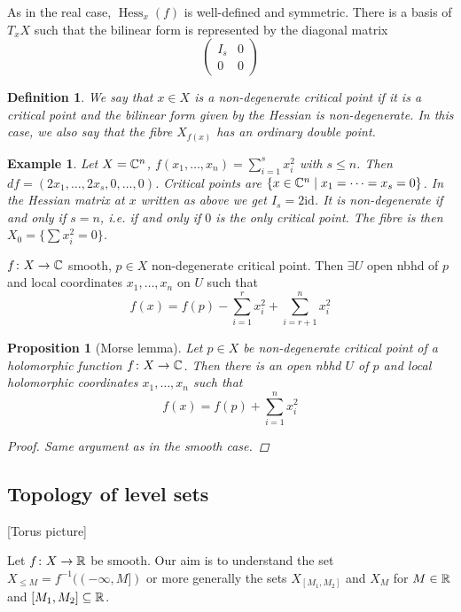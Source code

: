 \documentclass[A4paper, british]{amsart}
\theoremstyle{darkgreentheorem}
\newtheorem{prop}[thm]{Proposition}
\theoremstyle{darkbluedefinition}
\newtheorem{defn}[thm]{Definition}
\theoremstyle{darkredexample}
\newtheorem{exa}[thm]{Example}
\theoremstyle{remark}
\DeclareMathOperator{\Hess}{Hess}
\newcommand{\1}{\mathbbm{1}}
\newcommand{\id}{\mathrm{id}}
\newcommand{\sub}{\subseteq}
\begin{document}
As in the real case, $\Hess_{x}(f)$ is well-defined and symmetric.
There is a basis of $T_{x}X$ such that the bilinear form is represented by the diagonal matrix
\[ \begin{pmatrix} I_{s} & 0 \\ 0 & 0\end{pmatrix} \]

\begin{defn}
    We say that $x\in X$ is a \textit{non-degenerate critical point} if it is a critical point and the bilinear form given by the Hessian is non-degenerate.
    In this case, we also say that the fibre $X_{f(x)}$ has an \textit{ordinary double point}.
\end{defn}

\begin{exa}
    Let $X=\mathbb{C}^{n}$, $f(x_{1},\ldots,x_{n})=\sum_{i=1}^{s}x_{i}^{2}$ with $s\leqslant n$.
    Then $df=(2x_{1},\ldots,2x_{s},0,\ldots,0)$.
    Critical points are $\{x\in \mathbb{C}^{n}\mid x_{1}=\cdots =x_{s}=0\}$.
    In the Hessian matrix at $x$ written as above we get $I_{s}=2\id$.
    It is non-degenerate if and only if $s=n$, i.e. if and only if $0$ is the only critical point.
    The fibre is then $X_{0}=\{\sum x_{i}^{2}=0\}$.
\end{exa}

$f\colon X\to \mathbb{C}$ smooth, $p\in X$ non-degenerate critical point.
Then $\exists U$ open nbhd of $p$ and local coordinates $x_{1},\ldots,x_{n}$ on $U$ such that
\[ f(x)=f(p)-\sum_{i=1}^{r}x_{i}^{2}+\sum_{i=r+1}^{n}x_{i}^{2} \]

\begin{prop}[Morse lemma]
    Let $p\in X$ be non-degenerate critical point of a holomorphic function $f\colon X\to \mathbb{C}$.
    Then there is an open nbhd $U$ of $p$ and local holomorphic coordinates $x_{1},\ldots,x_{n}$ such that
    \[ f(x)=f(p)+\sum_{i=1}^{n}x_{i}^{2} \]
    \begin{proof}
	Same argument as in the smooth case.
    \end{proof}
\end{prop}

\subsection{Topology of level sets}

[Torus picture]

Let $f\colon X\to \mathbb{R}$ be smooth.
Our aim is to understand the set $X_{\leqslant M}=f^{-1}((-\infty,M])$ or more generally the sets $X_{[M_{1},M_{2}]}$ and $X_{M}$ for $M\in \mathbb{R}$ and $[M_{1},M_{2}]\sub \R$.
\end{document}

